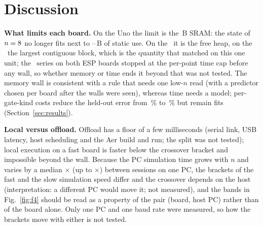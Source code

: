 \section{Discussion}
\textbf{What limits each board.} On the Uno the limit is the \MemSramUno\,B SRAM: the state of $n=8$ no longer fits next to \MemOverheadUnoMin--\MemOverheadUnoMax\,B of static use. On the \espA\ it is the free heap, on the \espB\ the largest contiguous block, which is the quantity that matched on this one unit; the \grover\ series on both ESP boards stopped at the per-point time cap before any wall, so whether memory or time ends it beyond that was not tested. The memory wall is consistent with a rule that needs one low-$n$ read (with a predictor chosen per board after the walls were seen), whereas time needs a model; per-gate-kind costs reduce the held-out error from \MapeOne\,\% to \MapeTwo\,\% but remain fits (Section~\ref{sec:results}).

\textbf{Local versus offload.} Offload has a floor of a few milliseconds (serial link, USB latency, host scheduling and the Aer build and run; the split was not tested); local execution on a fast board is faster below the crossover bracket and impossible beyond the wall. Because the PC simulation time grows with $n$ and varies by a median \SimSpreadMed$\times$ (up to \SimSpreadMax$\times$) between sessions on one PC, the brackets of the fast and the slow simulation speed differ and the crossover depends on the host (interpretation: a different PC would move it; not measured), and the bands in Fig.~\ref{fig:f4} should be read as a property of the pair (board, host PC) rather than of the board alone. Only one PC and one baud rate were measured, so how the brackets move with either is not tested.
